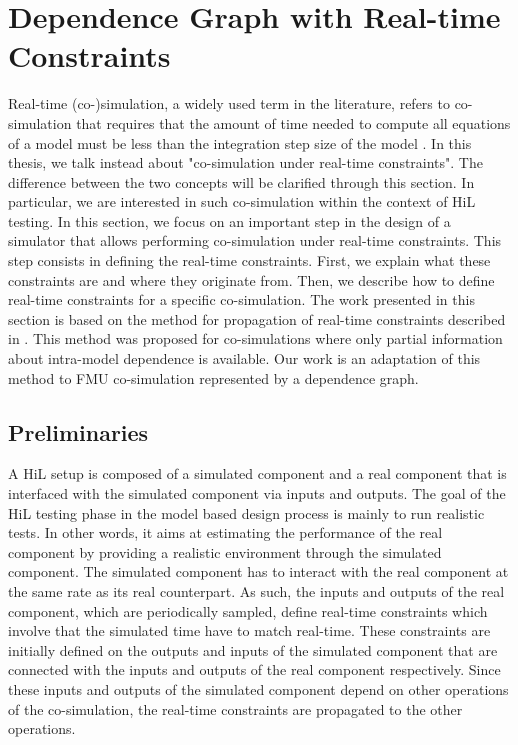 \section{Dependence Graph with Real-time Constraints}

Real-time (co-)simulation, a widely used term in the literature, refers to co-simulation that requires that the amount of time needed to compute all equations of a model must be less than the integration step size of the model \cite{belanger:2010}. In this thesis, we talk instead about "co-simulation under real-time constraints". The difference between the two concepts will be clarified through this section. In particular, we are interested in such co-simulation within the context of HiL testing. In this section, we focus on an important step in the design of a simulator that allows performing co-simulation under real-time constraints. This step consists in defining the real-time constraints. First, we explain what these constraints are and where they originate from. Then, we describe how to define real-time constraints for a specific co-simulation. The work presented in this section is based on the method for propagation of real-time constraints described in \cite{faure:2011}. This method was proposed for co-simulations where only partial information about intra-model dependence is available. Our work is an adaptation of this method to FMU co-simulation represented by a dependence graph.

\subsection{Preliminaries}

A HiL setup is composed of a simulated component and a real component that is interfaced with the simulated component via inputs and outputs. The goal of the HiL testing phase in the model based design process is mainly to run realistic tests. In other words, it aims at estimating the performance of the real component by providing a realistic environment through the simulated component. The simulated component has to interact with the real component at the same rate as its real counterpart. As such, the inputs and outputs of the real component, which are periodically sampled, define real-time constraints which involve that the simulated time have to match real-time. These constraints are initially defined on the outputs and inputs of the simulated component that are connected with the inputs and outputs of the real component respectively. Since these inputs and outputs of the simulated component depend on other operations of the co-simulation, the real-time constraints are propagated to the other operations.

